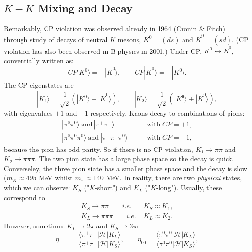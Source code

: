 \subsection{$K-\bar{K}$ Mixing and Decay}
%
Remarkably, CP violation was observed already in 1964 (Cronin \& Fitch) through study of decays of neutral $K$ mesons, $K^0=(d\bar{s})$ and $\bar{K}^0=(s\bar{d})$. (CP violation has also been observed in B physics in 2001.) Under CP, $K^0 \leftrightarrow \bar{K}^0$, conventially written as:
\begin{equation}
CP|K^0\rangle = -|\bar{K}^0 \rangle, \qquad CP|\bar{K}^0 \rangle = -|K^0\rangle.
\end{equation}
The CP eigenstates are
\begin{equation}
|K_1\rangle = \frac{1}{\sqrt{2}}(|K^0\rangle - |\bar{K}^0\rangle), \qquad |K_2\rangle = \frac{1}{\sqrt{2}}(|K^0\rangle + |\bar{K}^0\rangle),
\end{equation}
with eigenvalues $+1$ and $-1$ respectively. Kaons decay to combinations of pions:
\begin{equation}
\begin{split}
|\pi^0\pi^0\rangle\ \text{and} \ |\pi^+\pi^-\rangle \qquad &\text{with }CP=+1, \\
|\pi^0\pi^0\pi^0\rangle\ \text{and} \ |\pi^+\pi^-\pi^0\rangle \qquad &\text{with }CP=-1,
\end{split}
\end{equation}
because the pion has odd parity. So if there is no CP violation, $K_1 \to \pi\pi$ and $K_2 \to \pi\pi\pi$. The two pion state has a large phase space so the decay is quick. Converseley, the three pion state has a smaller phase space and the decay is slow ($m_K \approx 495$ MeV whilst $m_\pi \approx 140$ MeV. In reality, there are two \textit{physical} states, which we can observe: $K_S$ ("$K$-short") and $K_L$ ("$K$-long"). Usually, these correspond to 
\begin{equation}
\begin{split}
K_S \to \pi\pi \qquad \textit{i.e. } &K_S \approx K_1, \\
K_L \to \pi\pi\pi \qquad \textit{i.e. } &K_L \approx K_2.
\end{split}
\end{equation}
However, sometimes $K_L \to 2\pi$ and $K_S \to 3\pi$:
\begin{equation}
\eta_{+-} = \frac{\langle\pi^+\pi^-|\mathcal{H}|K_L\rangle}{\langle \pi^+\pi^- |\mathcal{H}|K_S \rangle}, \qquad 
\eta_{00} = \frac{\langle\pi^0\pi^0|\mathcal{H}|K_L\rangle}{\langle \pi^0\pi^0 |\mathcal{H}|K_S \rangle},
\end{equation}
